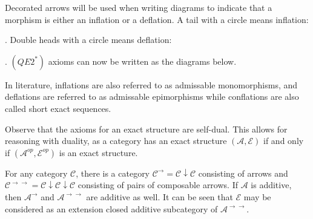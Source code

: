    \begin{remark}
        Decorated arrows will be used when writing diagrams to indicate that a morphism is either an inflation or a deflation. A tail with a circle means inflation: . Double heads with a circle means deflation: . $(QE2^*)$ axioms can now be written as the diagrams below.
        \begin{center}
        \end{center}
    \end{remark}

    \begin{remark}
        In literature, inflations are also referred to as admissable monomorphisms, and deflations are referred to as admissable epimorphisms while conflations are also called short exact sequences.
    \end{remark}

    \begin{remark}
        Observe that the axioms for an exact structure are self-dual. This allows for reasoning with duality, as a category has an exact structure $(\mathcal{A},\mathcal{E})$ if and only if $(\mathcal{A}^{op},\mathcal{E}^{op})$ is an exact structure.
    \end{remark}

    \begin{remark}
        For any category $\mathcal{C}$, there is a category $\mathcal{C}^{\rightarrow}=\mathcal{C}\downarrow\mathcal{C}$ consisting of arrows and $\mathcal{C}^{\rightarrow\rightarrow}=\mathcal{C}\downarrow\mathcal{C}\downarrow\mathcal{C}$ consisting of pairs of composable arrows. If $\mathcal{A}$ is additive, then $\mathcal{A}^{\rightarrow}$ and $\mathcal{A}^{\rightarrow\rightarrow}$ are additive as well. It can be seen that $\mathcal{E}$ may be considered as an extension closed additive subcategory of $\mathcal{A}^{\rightarrow\rightarrow}$.
    \end{remark}

